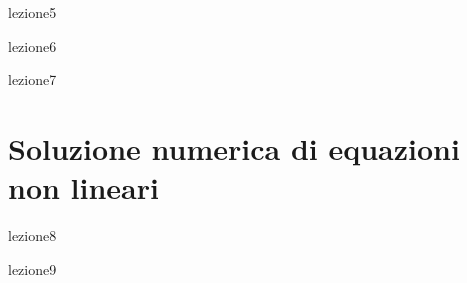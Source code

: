 \documentclass[12pt,a4paper,headings=optiontohead]{scrbook}
\begin{document}
{lezione5}


\newpage


{lezione6}


\newpage


{lezione7}


\newpage

\chapter{Soluzione numerica di equazioni non lineari}

{lezione8}


\newpage
{lezione9}
\end{document}
